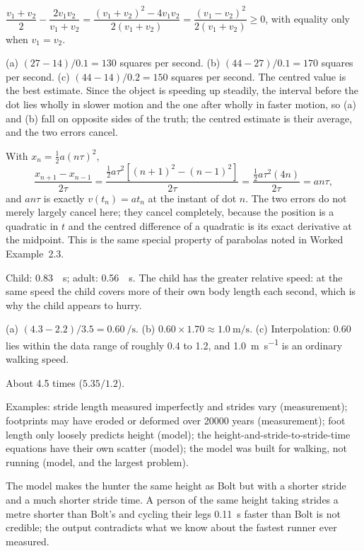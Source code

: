 \documentclass[11pt,twoside,openany]{book}
\begin{document}
\begin{description}[leftmargin=2.6em,itemsep=3pt,style=sameline]
  \item[1.37] $\dfrac{v_1 + v_2}{2} - \dfrac{2v_1v_2}{v_1 + v_2} = \dfrac{(v_1 + v_2)^2 - 4v_1v_2}{2(v_1 + v_2)} = \dfrac{(v_1 - v_2)^2}{2(v_1 + v_2)} \ge 0$, with equality only when $v_1 = v_2$.
  \item[1.38] (a) $(27-14)/0.1 = 130$ squares per second. (b) $(44-27)/0.1 = 170$ squares per second. (c) $(44-14)/0.2 = 150$ squares per second. The centred value is the best estimate. Since the object is speeding up steadily, the interval before the dot lies wholly in slower motion and the one after wholly in faster motion, so (a) and (b) fall on opposite sides of the truth; the centred estimate is their average, and the two errors cancel.
  \item[1.39] With $x_n = \tfrac12 a (n\tau)^2$,
  \[
  \frac{x_{n+1} - x_{n-1}}{2\tau} = \frac{\tfrac12 a\tau^2\left[(n+1)^2 - (n-1)^2\right]}{2\tau} = \frac{\tfrac12 a\tau^2 (4n)}{2\tau} = a n \tau,
  \]
  and $a n\tau$ is exactly $v(t_n) = a t_n$ at the instant of dot $n$. The two errors do not merely largely cancel here; they cancel completely, because the position is a quadratic in $t$ and the centred difference of a quadratic is its exact derivative at the midpoint. This is the same special property of parabolas noted in Worked Example~2.3.
  \item[1.40] Child: \SI{0.83}{\per\second}; adult: \SI{0.56}{\per\second}. The child has the greater relative speed: at the same speed the child covers more of their own body length each second, which is why the child appears to hurry.
  \item[1.41] (a) $(4.3 - 2.2)/3.5 = \SI{0.60}{\per\second}$. (b) $0.60 \times 1.70 \approx \SI{1.0}{\metre\per\second}$. (c) Interpolation: \num{0.60} lies within the data range of roughly \num{0.4} to \num{1.2}, and \SI{1.0}{\metre\per\second} is an ordinary walking speed.
  \item[1.42] About \num{4.5} times ($5.35/1.2$).
  \item[1.43] Examples: stride length measured imperfectly and strides vary (measurement); footprints may have eroded or deformed over \num{20000} years (measurement); foot length only loosely predicts height (model); the height-and-stride-to-stride-time equations have their own scatter (model); the model was built for walking, not running (model, and the largest problem).
  \item[1.44] The model makes the hunter the same height as Bolt but with a shorter stride and a much shorter stride time. A person of the same height taking strides a metre shorter than Bolt's and cycling their legs \SI{0.11}{\second} faster than Bolt is not credible; the output contradicts what we know about the fastest runner ever measured.

\end{description}
\end{document}
